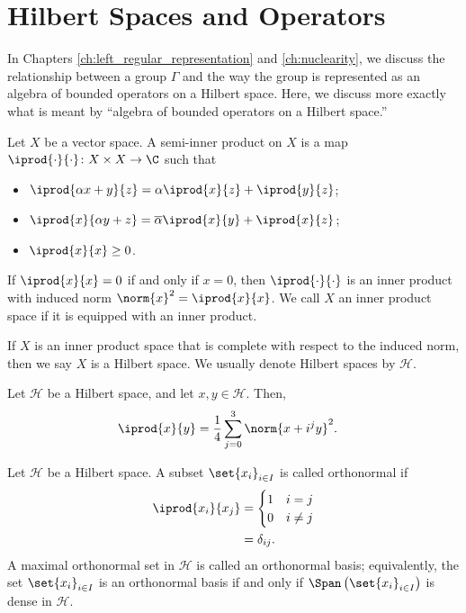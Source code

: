 \section{Hilbert Spaces and Operators}%
In Chapters \ref{ch:left_regular_representation} and \ref{ch:nuclearity}, we discuss the relationship between a group $\Gamma$ and the way the group is represented as an algebra of bounded operators on a Hilbert space. Here, we discuss more exactly what is meant by ``algebra of bounded operators on a Hilbert space.''
\begin{definition}
  Let $X$ be a vector space. A semi-inner product on $X$ is a map $ \iprod{\cdot}{\cdot}\colon X\times X \rightarrow \C $ such that
  \begin{itemize}
    \item $ \iprod{\alpha x + y}{z} = \alpha \iprod{x}{z} + \iprod{y}{z}$;
    \item $ \iprod{x}{\alpha y + z} = \overline{\alpha}\iprod{x}{y} + \iprod{x}{z}$;
    \item $ \iprod{x}{x}\geq 0 $.
  \end{itemize}
  If $ \iprod{x}{x} = 0 $ if and only if $ x = 0 $, then $ \iprod{\cdot}{\cdot} $ is an inner product with induced norm $\norm{x}^2 = \iprod{x}{x}$. We call $X$ an inner product space if it is equipped with an inner product.\newline

  If $X$ is an inner product space that is complete with respect to the induced norm, then we say $X$ is a Hilbert space. We usually denote Hilbert spaces by $ \mathcal{H} $.
\end{definition}
\begin{theorem}
  Let $\mathcal{H}$ be a Hilbert space, and let $x,y\in \mathcal{H}$. Then,
  \begin{align*}
    \iprod{x}{y} &= \frac{1}{4}\sum_{j=0}^{3} \norm{x + i^jy}^2.
  \end{align*}
\end{theorem}
\begin{definition}
  Let $\mathcal{H}$ be a Hilbert space. A subset $\set{x_i}_{i\in I}$ is called orthonormal if 
  \begin{align*}
    \iprod{x_i}{x_j} &= \begin{cases}
      1 & i=j\\
      0 & i\neq j
    \end{cases}\\
                     &= \delta_{ij}.
  \end{align*}
  A maximal orthonormal set in $\mathcal{H}$ is called an orthonormal basis; equivalently, the set $\set{x_i}_{i\in I}$ is an orthonormal basis if and only if $\Span\left(\set{x_i}_{i\in I}\right)$ is dense in $\mathcal{H}$.
\end{definition}
